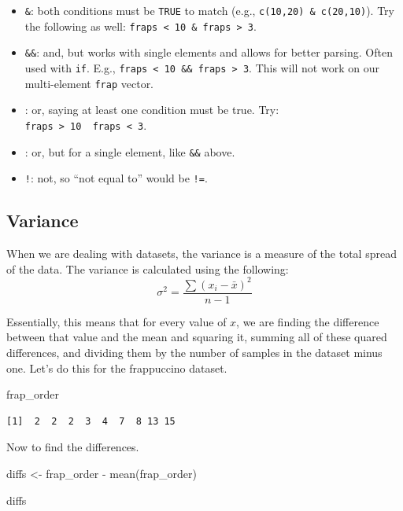 \documentclass[
  letterpaper,
  DIV=11,
  numbers=noendperiod]{scrreprt}
\newenvironment{Shaded}{\begin{snugshade}}{\end{snugshade}}
\newcommand{\FunctionTok}[1]{\textcolor[rgb]{0.28,0.35,0.67}{#1}}
\newcommand{\NormalTok}[1]{\textcolor[rgb]{0.00,0.23,0.31}{#1}}
\newcommand{\OtherTok}[1]{\textcolor[rgb]{0.00,0.23,0.31}{#1}}
\newcommand{\SpecialCharTok}[1]{\textcolor[rgb]{0.37,0.37,0.37}{#1}}
\begin{document}
\begin{itemize}
\item
  \texttt{\&}: both conditions must be \texttt{TRUE} to match (e.g.,
  \texttt{c(10,20)\ \&\ c(20,10)}). Try the following as well:
  \texttt{fraps\ \textless{}\ 10\ \&\ fraps\ \textgreater{}\ 3}.
\item
  \texttt{\&\&}: and, but works with single elements and allows for
  better parsing. Often used with \texttt{if}. E.g.,
  \texttt{fraps\ \textless{}\ 10\ \&\&\ fraps\ \textgreater{}\ 3}. This
  will not work on our multi-element \texttt{frap} vector.
\item
  \texttt{\textbar{}}: or, saying at least one condition must be true.
  Try:
  \texttt{fraps\ \textgreater{}\ 10\ \textbar{}\ fraps\ \textless{}\ 3}.
\item
  \texttt{\textbar{}\textbar{}}: or, but for a single element, like
  \texttt{\&\&} above.
\item
  \texttt{!}: not, so ``not equal to'' would be \texttt{!=}.
\end{itemize}

\subsection{Variance}\label{variance}

When we are dealing with datasets, the variance is a measure of the
total spread of the data. The variance is calculated using the
following:\[\sigma^2=\frac{\sum (x_i-\bar{x})^2}{n-1}\]

Essentially, this means that for every value of \(x\), we are finding
the difference between that value and the mean and squaring it, summing
all of these quared differences, and dividing them by the number of
samples in the dataset minus one. Let's do this for the frappuccino
dataset.

\begin{Shaded}
\begin{Highlighting}[]
\NormalTok{frap\_order}
\end{Highlighting}
\end{Shaded}

\begin{verbatim}
[1]  2  2  2  3  4  7  8 13 15
\end{verbatim}

Now to find the differences.

\begin{Shaded}
\begin{Highlighting}[]
\NormalTok{diffs }\OtherTok{\textless{}{-}}\NormalTok{ frap\_order }\SpecialCharTok{{-}} \FunctionTok{mean}\NormalTok{(frap\_order)}

\NormalTok{diffs}
\end{Highlighting}
\end{Shaded}
\end{document}
